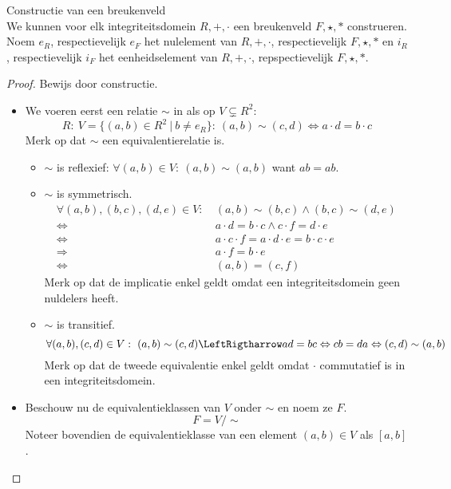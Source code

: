 \documentclass[main.tex]{subfiles}
\begin{document}
\begin{st}
  Constructie van een breukenveld\\
  We kunnen voor elk integriteitsdomein $R,+,\cdot$ een breukenveld $F,\star,*$ construeren.
  Noem $e_{R}$, respectievelijk $e_{F}$ het nulelement van $R,+,\cdot$, respectievelijk $F,\star,*$ en $i_{R}$, respectievelijk $i_{F}$ het eenheidselement van $R,+,\cdot$, repspectievelijk $F,\star,*$.
  \begin{proof}
    Bewijs door constructie.
    \begin{itemize}
    \item We voeren eerst een relatie $\sim$ in als op $V\subsetneq R^{2}$:
      \[ R:\ V = \{ (a,b) \in R^{2} \ |\ b \neq e_{R} \}:\ (a,b) \sim (c,d) \Leftrightarrow a\cdot d = b\cdot c \]
      Merk op dat $\sim$ een equivalentierelatie is.
      \begin{itemize}
      \item $\sim$ is reflexief: $\forall (a,b) \in V:\ (a,b) \sim (a,b)$ want $ab = ab$.
      \item $\sim$ is symmetrisch.\\
        \[
        \begin{array}{rl}
          \forall (a,b), (b,c), (d,e) \in V:\ & (a,b) \sim (b,c) \wedge (b,c) \sim (d,e)\\
          \Leftrightarrow & a\cdot d = b\cdot c \wedge c\cdot f = d\cdot e\\
          \Leftrightarrow & a\cdot c \cdot f = a\cdot d \cdot e = b \cdot c \cdot e\\
          \Rightarrow & a\cdot f = b \cdot e\\
          \Leftrightarrow & (a,b) = (c,f)
        \end{array}
        \]
        Merk op dat de implicatie enkel geldt omdat een integriteitsdomein geen nuldelers heeft.
      \item $\sim$ is transitief.\\
        \[ \forall (a,b), (c,d) \in V:\ (a,b) \sim (c,d) \LeftRigtharrow ad = bc \Leftrightarrow cb = da \Leftrightarrow (c,d) \sim (a,b) \]
        Merk op dat de tweede equivalentie enkel geldt omdat $\cdot$ commutatief is in een integriteitsdomein. 
      \end{itemize}
    \item Beschouw nu de equivalentieklassen van $V$ onder $\sim$ en noem ze $F$.
      \[ F = V/\sim \]
      Noteer bovendien de equivalentieklasse van een element $(a,b)\in V$ als $[a,b]$.
      \begin{itemize}

\end{itemize}
\end{itemize}
\end{proof}
\end{st}
\end{document}
